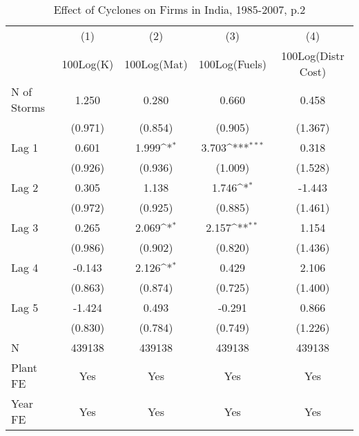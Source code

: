 \begin{table}[htbp]\centering
\def\sym#1{\ifmmode^{#1}\else\(^{#1}\)\fi}
\caption{Effect of Cyclones on Firms in India, 1985-2007, p.2}
\begin{tabular}{l*{4}{c}}
\toprule
                &\multicolumn{1}{c}{(1)}&\multicolumn{1}{c}{(2)}&\multicolumn{1}{c}{(3)}&\multicolumn{1}{c}{(4)}\\
                &\multicolumn{1}{c}{100Log(K)}&\multicolumn{1}{c}{100Log(Mat)}&\multicolumn{1}{c}{100Log(Fuels)}&\multicolumn{1}{c}{100Log(Distr Cost)}\\
\midrule
N of Storms     &    1.250         &    0.280         &    0.660         &    0.458         \\
                &  (0.971)         &  (0.854)         &  (0.905)         &  (1.367)         \\
\addlinespace
Lag 1           &    0.601         &    1.999\sym{*}  &    3.703\sym{***}&    0.318         \\
                &  (0.926)         &  (0.936)         &  (1.009)         &  (1.528)         \\
\addlinespace
Lag 2           &    0.305         &    1.138         &    1.746\sym{*}  &   -1.443         \\
                &  (0.972)         &  (0.925)         &  (0.885)         &  (1.461)         \\
\addlinespace
Lag 3           &    0.265         &    2.069\sym{*}  &    2.157\sym{**} &    1.154         \\
                &  (0.986)         &  (0.902)         &  (0.820)         &  (1.436)         \\
\addlinespace
Lag 4           &   -0.143         &    2.126\sym{*}  &    0.429         &    2.106         \\
                &  (0.863)         &  (0.874)         &  (0.725)         &  (1.400)         \\
\addlinespace
Lag 5           &   -1.424         &    0.493         &   -0.291         &    0.866         \\
                &  (0.830)         &  (0.784)         &  (0.749)         &  (1.226)         \\
\midrule
N               &   439138         &   439138         &   439138         &   439138         \\
Plant FE        &      Yes         &      Yes         &      Yes         &      Yes         \\
Year FE         &      Yes         &      Yes         &      Yes         &      Yes         \\

\end{tabular}
\end{table}
